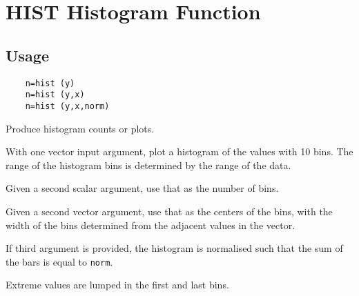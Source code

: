 \section{HIST Histogram Function}

\subsection{Usage}

\begin{verbatim}
	n=hist (y)
	n=hist (y,x)
	n=hist (y,x,norm)
\end{verbatim}
 Produce histogram counts or plots.

 With one vector input argument, plot a histogram of the values with
 10 bins.  The range of the histogram bins is determined by the range
 of the data.

 Given a second scalar argument, use that as the number of bins.

 Given a second vector argument, use that as the centers of the bins,
 with the width of the bins determined from the adjacent values in
 the vector.

 If third argument is provided, the histogram is normalised such that
 the sum of the bars is equal to \verb|norm|.

 Extreme values are lumped in the first and last bins.

